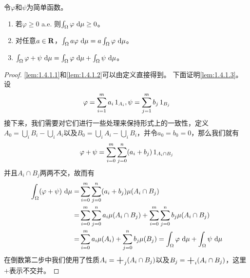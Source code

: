 \documentclass[../main.tex]{subfiles}
\begin{document}
\begin{lemma}\label{lem:1.4.1}
令\(\varphi\)和\(\psi\)为简单函数。
\begin{enumerate}
	\item \label{lem:1.4.1.1} 若\(\varphi\geq0\) a.e. 则\(\int_\Omega \varphi\,\dif\mu\geq0\)。
	\item \label{lem:1.4.1.2} 对任意\(a\in\mathbf{R}\)，\(\int_\Omega a\varphi\,\dif\mu=a\int_\Omega \varphi\,\dif\mu\)。
	\item \label{lem:1.4.1.3} \(\int_\Omega \varphi+\psi\,\dif\mu=\int_\Omega \varphi\,\dif\mu+\int_\Omega \psi\,\dif\mu\)。
\end{enumerate}
\end{lemma}
\begin{proof}
	\ref{lem:1.4.1.1}和\ref{lem:1.4.1.2}可以由定义直接得到。
	下面证明\ref{lem:1.4.1.3}。
	设
	\[\varphi=\sum_{i=1}^ma_i\operatorname{1}_{A_i}, \psi=\sum_{j=1}^mb_j\operatorname{1}_{B_j}\]
	接下来，我们需要对它们进行一些处理来保持形式上的一致性，定义\(A_0=\bigcup_iB_i-\bigcup_iA_i\)以及\(B_0=\bigcup_iA_i-\bigcup_iB_i\)，并令\(a_0=b_0=0\)，那么我们就有
	\[\varphi+\psi=\sum_{i=0}^m\sum_{j=0}^n(a_i+b_j)\operatorname{1}_{A_i\cap B_j}\]
	并且\(A_i\cap B_j\)两两不交，故而有
	\begin{align*}
		\int_\Omega(\varphi+\psi)\,\dif\mu=&\sum_{i=0}^m\sum_{j=0}^n(a_i+b_j)\mu(A_i\cap B_j)\\
		=&\sum_{i=0}^m\sum_{j=0}^na_i\mu(A_i\cap B_j)+\sum_{i=0}^m\sum_{j=0}^nb_j\mu(A_i\cap B_j)\\
		=&\sum_{i=0}^ma_i\mu(A_i)+\sum_{j=0}^nb_j\mu(B_j)
		=\int_\Omega \varphi\,\dif\mu+\int_\Omega \psi\,\dif\mu
	\end{align*}
	在倒数第二步中我们使用了性质\(A_i=\bigplus_j(A_i\cap B_j)\)以及\(B_j=\bigplus_i(A_i\cap B_j)\)，这里\(+\)表示不交并。
\end{proof}
\end{document}
